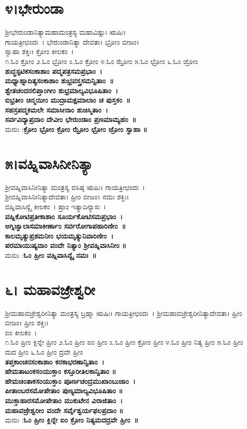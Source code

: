 \section{೪।ಭೇರುಂಡಾ}
ಶ್ರೀಭೇರುಂಡಾನಿತ್ಯಾಮಹಾಮಂತ್ರಸ್ಯ ಮಹಾವಿಷ್ಣುಃ ಋಷಿಃ। \\ಗಾಯತ್ರೀಛಂದಃ~। ಭೇರುಂಡಾನಿತ್ಯಾ ದೇವತಾ। ಭ್ರೋಂ ಬೀಜಂ।\\ ಸ್ವಾಹಾ ಶಕ್ತಿಃ। ಕ್ರೋಂ ಕೀಲಕಂ~।\\
೧.ಓಂ ಕ್ರೋಂ  ೨.ಓಂ ಭ್ರೋಂ ೩.ಓಂ ಕ್ರೋಂ  ೪.ಓಂ ಝ್ರೋಂ ೫.ಓಂ ಛ್ರೋಂ  ೬.ಓಂ ಜ್ರೋಂ \\
{\bfseries ಶುದ್ಧಸ್ಫಟಿಕಸಂಕಾಶಾಂ ಪದ್ಮಪತ್ರಸಮಪ್ರಭಾಂ~।\\
ಮಧ್ಯಾಹ್ನಾದಿತ್ಯಸಂಕಾಶಾಂ ಶುಭ್ರವಸ್ತ್ರಸಮನ್ವಿತಾಂ~॥\\
ಶ್ವೇತಚಂದನಲಿಪ್ತಾಂಗೀಂ ಶುಭ್ರಮಾಲ್ಯವಿಭೂಷಿತಾಂ~।\\	
ಬಿಭ್ರತೀಂ ಚಿನ್ಮಯೀಂ ಮುದ್ರಾಮಕ್ಷಮಾಲಾಂ ಚ ಪುಸ್ತಕಂ~॥\\
ಸಹಸ್ರಪದ್ಮಕಮಲೇ ಸಮಾಸೀನಾಂ ಶುಚಿಸ್ಮಿತಾಂ~।\\
ಸರ್ವವಿದ್ಯಾಪ್ರದಾಂ ದೇವೀಂ ಭೇರುಂಡಾಂ ಪ್ರಣಮಾಮ್ಯಹಂ~॥\\}
ಮನುಃ :{\bfseries  ಕ್ರೋಂ ಭ್ರೋಂ ಕ್ರೋಂ ಝ್ರೋಂ ಛ್ರೋಂ ಜ್ರೋಂ ಸ್ವಾಹಾ ॥}
\section{೫।ವಹ್ನಿವಾಸಿನೀನಿತ್ಯಾ}
ಶ್ರೀವಹ್ನಿವಾಸಿನೀನಿತ್ಯಾ ಮಂತ್ರಸ್ಯ ವಸಿಷ್ಠ ಋಷಿಃ। ಗಾಯತ್ರೀಛಂದಃ~।\\ ಶ್ರೀವಹ್ನಿವಾಸಿನೀನಿತ್ಯಾದೇವತಾ। ಹ್ರೀಂ ಬೀಜಂ। ನಮಃ ಶಕ್ತಿಃ।\\ ವಹ್ನಿವಾಸಿನ್ಯೈ ಕೀಲಕಂ~। ಹ್ರಾಂ ಇತ್ಯಾದಿನ್ಯಾಸಃ~।\\
{\bfseries ವಹ್ನಿಕೋಟಿಪ್ರತೀಕಾಶಾಂ ಸೂರ್ಯಕೋಟಿಸಮಪ್ರಭಾಂ~।\\
ಅಗ್ನಿಜ್ವಾಲಾಸಮಾಕೀರ್ಣಾಂ ಸರ್ವರೋಗಾಪಹಾರಿಣೀಂ~॥\\
ಕಾಲಮೃತ್ಯುಪ್ರಶಮನೀಂ ಭಯಮೃತ್ಯುನಿವಾರಿಣೀಂ~।\\
ಪರಮಾಯುಷ್ಯದಾಂ ವಂದೇ ನಿತ್ಯಾಂ ಶ್ರೀವಹ್ನಿವಾಸಿನೀಂ ॥\\}
ಮನುಃ :{\bfseries ಓಂ ಹ್ರೀಂ ವಹ್ನಿವಾಸಿನ್ಯೈ ನಮಃ~॥}
\section{೬। ಮಹಾವಜ್ರೇಶ್ವರೀ}
ಶ್ರೀಮಹಾವಜ್ರೇಶ್ವರೀನಿತ್ಯಾ ಮಂತ್ರಸ್ಯ ಬ್ರಹ್ಮಾ ಋಷಿಃ। ಗಾಯತ್ರೀಛಂದಃ~। ಶ್ರೀಮಹಾವಜ್ರೇಶ್ವರೀನಿತ್ಯಾದೇವತಾ। ಹ್ರೀಂ ಬೀಜಂ। ಹ್ರೀಂ ಶಕ್ತಿಃ।\\
ಐಂ ಕೀಲಕಂ~।\\
೧.ಓಂ ಹ್ರೀಂ ಕ್ಲಿನ್ನೇ ಹ್ರೀಂ  ೨.ಓಂ ಹ್ರೀಂ ಐಂ ಹ್ರೀಂ  ೩.ಓಂ ಹ್ರೀಂ ಕ್ರೋಂ ಹ್ರೀಂ ೪.ಓಂ ಹ್ರೀಂ ನಿತ್ಯ ಹ್ರೀಂ  ೫.ಓಂ ಹ್ರೀಂ ಮದ ಹ್ರೀಂ ೬.ಓಂ ಹ್ರೀಂ ದ್ರವೇ ಹ್ರೀಂ \\
{\bfseries ತಪ್ತಕಾಂಚನಸಂಕಾಶಾಂ ಕನಕಾಭರಣಾನ್ವಿತಾಂ~।\\
ಹೇಮತಾಟಂಕಸಂಯುಕ್ತಾಂ ಕಸ್ತೂರೀತಿಲಕಾನ್ವಿತಾಂ ॥\\
ಹೇಮಚಿಂತಾಕಸಂಯುಕ್ತಾಂ ಪೂರ್ಣಚಂದ್ರಮುಖಾಂಬುಜಾಂ~।\\
ಪೀತಾಂಬರಸಮೋಪೇತಾಂ ಪುಣ್ಯಮಾಲ್ಯವಿಭೂಷಿತಾಂ ॥\\
ಮುಕ್ತಾಹಾರಸಮೋಪೇತಾಂ ಮುಕುಟೇನ ವಿರಾಜಿತಾಂ~।\\
ಮಹಾವಜ್ರೇಶ್ವರೀಂ ವಂದೇ ಸರ್ವೈಶ್ವರ್ಯಫಲಪ್ರದಾಂ ॥\\}
ಮನುಃ :{\bfseries  ಓಂ ಹ್ರೀಂ ಕ್ಲಿನ್ನೇ ಐಂ ಕ್ರೋಂ ನಿತ್ಯಮದದ್ರವೇ ಹ್ರೀಂ~॥}
